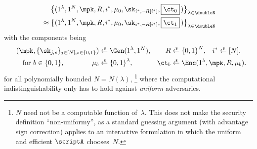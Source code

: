 \begin{definition}
\begin{align*}
&
\bigl\{(
1^\lambda,1^N,\mpk,R,i^\ast,\mu_0,\sk_{i^\ast,\neg R[i^\ast]},\boxed{\ct_0}\,
)\bigr\}_{\lambda\in\doubleN}
\\
{}\approx{}&
\bigl\{(
1^\lambda,1^N,\mpk,R,i^\ast,\mu_0,\sk_{i^\ast,\neg R[i^\ast]},\boxed{\ct_1}\,
)\bigr\}_{\lambda\in\doubleN}
\end{align*}
with the components being
\begin{align*}
(\mpk,\{\sk_{j,s}\}_{j\in[N],s\in\bit})
&{}\draws\Gen(1^\lambda,1^N),&
R&{}\draws\bit^N,&
i^\ast&{}\draws[N],\\
\textup{for }b\in\bit,\WideNarrow{\qquad}{}\qquad
\mu_b&{}\draws\bit^\lambda,&
\ct_b&\mathrlap{{}\draws\Enc(1^\lambda,\mpk,R,\mu_b).}
\end{align*}
for all polynomially bounded ${N=N(\lambda)}$,%
\footnote{$N$ need not be a computable function of~$\lambda$.
This does not make the security definition ``non-uniformy'',
as a standard guessing argument (with advantage sign correction) applies to an interactive formulation
in which the uniform and efficient $\scriptA$ chooses~$N$.}
where the computational indistinguishability only has to hold against \emph{uniform} adversaries.
\end{definition}

